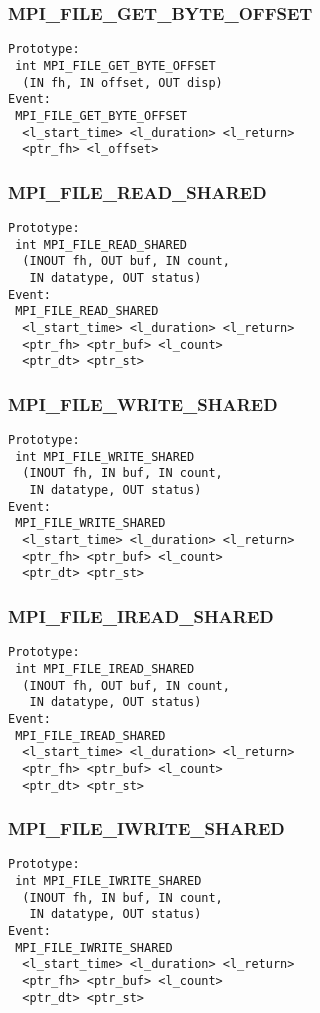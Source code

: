 \documentclass{article}
\begin{document}
\subsubsection{MPI\_FILE\_GET\_BYTE\_OFFSET}
\label{sec:MPIFILEGETBYTEOFFSET}
\begin{verbatim}
Prototype:
 int MPI_FILE_GET_BYTE_OFFSET
  (IN fh, IN offset, OUT disp)
Event:
 MPI_FILE_GET_BYTE_OFFSET 
  <l_start_time> <l_duration> <l_return>
  <ptr_fh> <l_offset>
\end{verbatim}

\subsubsection{MPI\_FILE\_READ\_SHARED}
\label{sec:MPIFILEREADSHARED}
\begin{verbatim}
Prototype:
 int MPI_FILE_READ_SHARED
  (INOUT fh, OUT buf, IN count, 
   IN datatype, OUT status)
Event:
 MPI_FILE_READ_SHARED 
  <l_start_time> <l_duration> <l_return>
  <ptr_fh> <ptr_buf> <l_count>
  <ptr_dt> <ptr_st>
\end{verbatim}

\subsubsection{MPI\_FILE\_WRITE\_SHARED}
\label{sec:MPIFILEWRITESHARED}
\begin{verbatim}
Prototype:
 int MPI_FILE_WRITE_SHARED
  (INOUT fh, IN buf, IN count, 
   IN datatype, OUT status)
Event:
 MPI_FILE_WRITE_SHARED 
  <l_start_time> <l_duration> <l_return>
  <ptr_fh> <ptr_buf> <l_count>
  <ptr_dt> <ptr_st>
\end{verbatim}

\subsubsection{MPI\_FILE\_IREAD\_SHARED}
\label{sec:MPIFILEIREADSHARED}
\begin{verbatim}
Prototype:
 int MPI_FILE_IREAD_SHARED
  (INOUT fh, OUT buf, IN count, 
   IN datatype, OUT status)
Event:
 MPI_FILE_IREAD_SHARED 
  <l_start_time> <l_duration> <l_return>
  <ptr_fh> <ptr_buf> <l_count>
  <ptr_dt> <ptr_st>
\end{verbatim}

\subsubsection{MPI\_FILE\_IWRITE\_SHARED}
\label{sec:MPIFILEIWRITESHARED}
\begin{verbatim}
Prototype:
 int MPI_FILE_IWRITE_SHARED
  (INOUT fh, IN buf, IN count, 
   IN datatype, OUT status)
Event:
 MPI_FILE_IWRITE_SHARED 
  <l_start_time> <l_duration> <l_return>
  <ptr_fh> <ptr_buf> <l_count>
  <ptr_dt> <ptr_st>
\end{verbatim}
\end{document}
